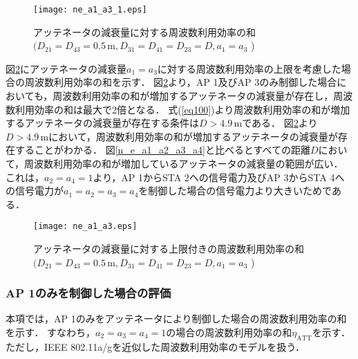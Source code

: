 \documentclass[master]{kuisthesis}		%
\begin{document}
\ifnum {}
\begin{figure}[!t]
\centering
\texttt{[image: ne\_a1\_a3\_1.eps]}
\caption{アッテネータの減衰量に対する周波数利用効率の和   \newline $(D_{21}=D_{43}=0.5\,\mathrm{m},D_{31}=D_{41}=D_{23}=D,a_1=a_3$ )}
\label{n_e_a1_a3_1}
\end{figure}
\fi


図\ref{n_e_a1_a3}にアッテネータの減衰量$a_1=a_3$に対する周波数利用効率の上限を考慮した場合の周波数利用効率の和を示す．
図\ref{n_e_a1_a3}より，AP 1及びAP 3のみ制御した場合においても，周波数利用効率の和が増加するアッテネータの減衰量が存在し，周波数利用効率の和は最大で2倍となる．
式(\ref{eq100})より周波数利用効率の和が増加するアッテネータの減衰量が存在する条件は$D > 4.9\,\mathrm{m}$である．
図\ref{n_e_a1_a3}より$D > 4.9\,\mathrm{m}$において，周波数利用効率の和が増加するアッテネータの減衰量が存在することがわかる．
図\ref{n_e_a1_a2_a3_a4}と比べるとすべての距離$D$において，周波数利用効率の和が増加しているアッテネータの減衰量の範囲が広い．
これは，$a_2=a_4=1$より，AP 1からSTA 2への信号電力及びAP 3からSTA 4への信号電力が$a_1=a_2=a_3=a_4$を制御した場合の信号電力より大きいためである．
\ifnum {}
\begin{figure}[!t]
\centering
\texttt{[image: ne\_a1\_a3.eps]}
\caption{アッテネータの減衰量に対する上限付きの周波数利用効率の和   \newline $(D_{21}=D_{43}=0.5\,\mathrm{m},D_{31}=D_{41}=D_{23}=D,a_1=a_3$ )}
\label{n_e_a1_a3}
\end{figure}
\fi

\subsubsection{AP 1のみを制御した場合の評価}
本項では，AP 1のみをアッテネータにより制御した場合の周波数利用効率の和を示す．
すなわち，$a_2=a_3=a_4=1$の場合の周波数利用効率の和$\eta_\mathrm{ATT}$を示す．
ただし，IEEE 802.11a/gを近似した周波数利用効率のモデルを扱う．
\end{document}
